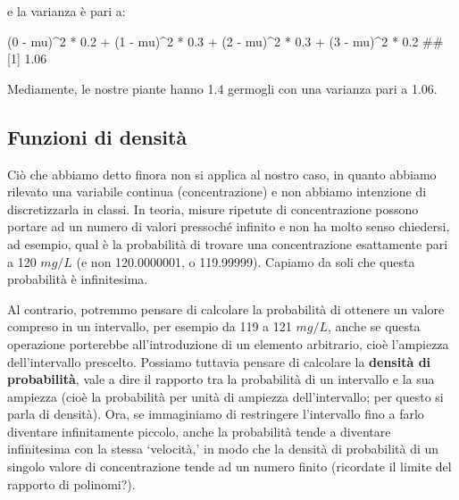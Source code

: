 \documentclass[a4paper,12pt,oneside]{book}
\newenvironment{Shaded}{\begin{snugshade}}{\end{snugshade}}
\newcommand{\DecValTok}[1]{#1}
\newcommand{\FloatTok}[1]{#1}
\newcommand{\SpecialCharTok}[1]{#1}
\newcommand{\DocumentationTok}[1]{#1}
\newcommand{\NormalTok}[1]{#1}
\begin{document}
e la varianza è pari a:

\begin{Shaded}
\begin{Highlighting}[]
\NormalTok{(}\DecValTok{0} \SpecialCharTok{{-}}\NormalTok{ mu)}\SpecialCharTok{\^{}}\DecValTok{2} \SpecialCharTok{*} \FloatTok{0.2} \SpecialCharTok{+}\NormalTok{ (}\DecValTok{1} \SpecialCharTok{{-}}\NormalTok{ mu)}\SpecialCharTok{\^{}}\DecValTok{2} \SpecialCharTok{*} \FloatTok{0.3} \SpecialCharTok{+}\NormalTok{ (}\DecValTok{2} \SpecialCharTok{{-}}\NormalTok{ mu)}\SpecialCharTok{\^{}}\DecValTok{2} \SpecialCharTok{*} \FloatTok{0.3} \SpecialCharTok{+}
\NormalTok{  (}\DecValTok{3} \SpecialCharTok{{-}}\NormalTok{ mu)}\SpecialCharTok{\^{}}\DecValTok{2} \SpecialCharTok{*} \FloatTok{0.2}
\DocumentationTok{\#\# [1] 1.06}
\end{Highlighting}
\end{Shaded}

Mediamente, le nostre piante hanno 1.4 germogli con una varianza pari a 1.06.

\hypertarget{funzioni-di-densituxe0}{%
\subsection{Funzioni di densità}\label{funzioni-di-densituxe0}}

Ciò che abbiamo detto finora non si applica al nostro caso, in quanto abbiamo rilevato una variabile continua (concentrazione) e non abbiamo intenzione di discretizzarla in classi. In teoria, misure ripetute di concentrazione possono portare ad un numero di valori pressoché infinito e non ha molto senso chiedersi, ad esempio, qual è la probabilità di trovare una concentrazione esattamente pari a 120 \(mg/L\) (e non 120.0000001, o 119.99999). Capiamo da soli che questa probabilità è infinitesima.

Al contrario, potremmo pensare di calcolare la probabilità di ottenere un valore compreso in un intervallo, per esempio da 119 a 121 \(mg/L\), anche se questa operazione porterebbe all'introduzione di un elemento arbitrario, cioè l'ampiezza dell'intervallo prescelto. Possiamo tuttavia pensare di calcolare la \textbf{densità di probabilità}, vale a dire il rapporto tra la probabilità di un intervallo e la sua ampiezza (cioè la probabilità per unità di ampiezza dell'intervallo; per questo si parla di densità). Ora, se immaginiamo di restringere l'intervallo fino a farlo diventare infinitamente piccolo, anche la probabilità tende a diventare infinitesima con la stessa `velocità,' in modo che la densità di probabilità di un singolo valore di concentrazione tende ad un numero finito (ricordate il limite del rapporto di polinomi?).
\end{document}
